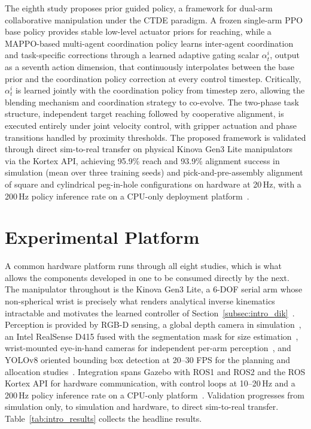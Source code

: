 The eighth study proposes prior guided policy, a framework for dual-arm collaborative manipulation under the CTDE paradigm. A frozen single-arm PPO base policy provides stable
low-level actuator priors for reaching, while a MAPPO-based multi-agent coordination policy learns
inter-agent coordination and task-specific corrections through a learned adaptive gating scalar
$\alpha_{t}^{i}$, output as a seventh action dimension, that continuously interpolates between the
base prior and the coordination policy correction at every control timestep. Critically,
$\alpha_{t}^{i}$ is learned jointly with the coordination policy from timestep zero, allowing the
blending mechanism and coordination strategy to co-evolve. The two-phase task structure,
independent target reaching followed by cooperative alignment, is executed entirely under joint
velocity control, with gripper actuation and phase transitions handled by proximity thresholds. The
proposed framework is validated through direct sim-to-real transfer on physical Kinova Gen3 Lite
manipulators via the Kortex API, achieving 95.9\% reach and 93.9\% alignment success in simulation
(mean over three training seeds) and pick-and-pre-assembly alignment of square and cylindrical peg-in-hole configurations on hardware
at 20\,Hz, with a 200\,Hz policy inference rate on a CPU-only deployment
platform~\citep{sk2026priorguided}.

\section{Experimental Platform}\label{sec:intro_platform}

A common hardware platform runs through all eight studies, which is what allows the components
developed in one to be consumed directly by the next. The manipulator throughout is the Kinova Gen3
Lite, a 6-DOF serial arm whose non-spherical wrist is precisely what renders analytical inverse
kinematics intractable and motivates the learned controller of
Section~\ref{subsec:intro_dik}~\citep{sk2025diktracking}. Perception is provided by RGB-D sensing,
a global depth camera in simulation~\citep{sk2024bolthandling}, an Intel RealSense D415 fused with
the segmentation mask for size estimation~\citep{sk2024boltsorting}, wrist-mounted eye-in-hand
cameras for independent per-arm perception~\citep{sk2025sharedvision}, and YOLOv8 oriented bounding
box detection at 20--30 FPS for the planning and allocation
studies~\citep{surya2025iapf,sk2025competitive}. Integration spans Gazebo with ROS1 and ROS2 and the
ROS Kortex API for hardware communication, with control loops at 10--20\,Hz and a 200\,Hz policy
inference rate on a CPU-only platform~\citep{sk2025competitive,sk2026priorguided}. Validation progresses
from simulation only, to simulation and hardware, to direct sim-to-real transfer.
Table~\ref{tab:intro_results} collects the headline results.

